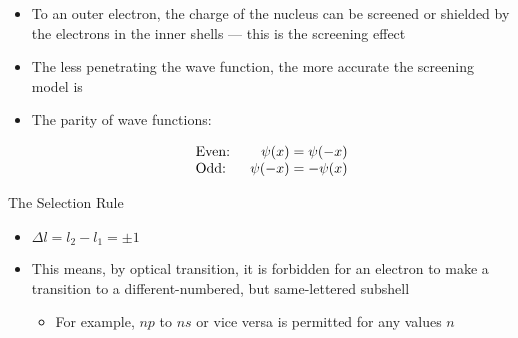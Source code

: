 \begin{itemize}
\begin{itemize}
      \item To an outer electron, the charge of the nucleus can be screened or shielded by the electrons in the inner shells — this is the screening effect

      \item The less penetrating the wave function, the more accurate the screening model is

      \item The parity of wave functions: 

        $$\begin{array}{l r} \text{Even: }&\psi(x) = \psi(-x)\\ \text{Odd: }&\psi(-x) = -\psi(x) \end{array}$$

    \end{itemize}

  \itemm The Selection Rule

    \begin{itemize}

      \item $\Delta l = l_2 - l_1 = \pm 1$

      \item This means, by optical transition, it is forbidden for an electron to make a transition to a different-numbered, but same-lettered subshell

        \begin{itemize}

          \item For example, $np$ to $ns$ or vice versa is permitted for any values $n$

        \end{itemize}

    \end{itemize}

\end{itemize}



